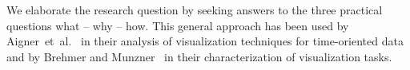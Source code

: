 %

%

We elaborate the research question by seeking answers to the three practical questions what -- why -- how. This general approach has been used by Aigner~et~al.~\cite{Aigner2011} in their analysis of visualization techniques for time-oriented data and by Brehmer and Munzner~\cite{Brehmer2013} in their characterization of visualization tasks.




